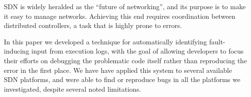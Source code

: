 SDN is widely heralded as the ``future of networking'', and its purpose is to make
it easy to manage networks. Achieving this end requires coordination
between distributed controllers, a task that is highly prone to errors.

In this paper we developed a technique for automatically
identifying fault-inducing input from execution logs, with the
goal of allowing developers to focus their efforts on debugging the problematic
code itself rather than reproducing the error in the first place.
We have have applied this system to several available SDN platforms, and
were able to find or reproduce bugs in all the platforms we investigated,
despite several noted limitations.



